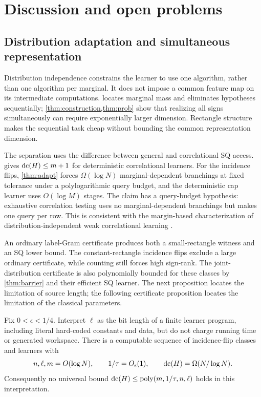 \section{Discussion and open problems}\label{sec:discussion}
\subsection{Distribution adaptation and simultaneous representation}
Distribution independence constrains the learner to use one algorithm, rather than one algorithm per marginal. It does not impose a common feature map on its intermediate computations.  locates marginal mass and eliminates hypotheses sequentially; \cref{thm:construction,thm:prob} show that realizing all signs simultaneously can require exponentially larger dimension. Rectangle structure makes the sequential task cheap without bounding the common representation dimension.

The separation uses the difference between general and correlational SQ access.  gives $\operatorname{dc}(H)\le m+1$ for deterministic correlational learners. For the incidence flips, \cref{thm:adapt} forces $\Omega(\log N)$ marginal-dependent branchings at fixed tolerance under a polylogarithmic query budget, and the deterministic cap learner uses $O(\log M)$ stages. The claim has a query-budget hypothesis: exhaustive correlation testing uses no marginal-dependent branchings but makes one query per row. This is consistent with the margin-based characterization of distribution-independent weak correlational learning \citep{Feldman08,Feldman11}.

An ordinary label-Gram certificate produces both a small-rectangle witness and an SQ lower bound. The constant-rectangle incidence flips exclude a large ordinary certificate, while counting still forces high sign-rank. The joint-distribution certificate is also polynomially bounded for these classes by \cref{thm:barrier} and their efficient SQ learner. The next proposition locates the limitation of source length; the following certificate proposition locates the limitation of the classical parameters.

\begin{theorem}\label{thm:description}
Fix $0<\epsilon<1/4$. Interpret $\ell$ as the bit length of a finite learner program, including literal hard-coded constants and data, but do not charge running time or generated workspace. There is a computable sequence of incidence-flip classes and learners with
\[
 n,\ell,m=O(\log N),\qquad 1/\tau=O_\epsilon(1),\qquad
 \operatorname{dc}(H)=\Omega(N/\log N).
\]
Consequently no universal bound $\operatorname{dc}(H)\le\operatorname{poly}(m,1/\tau,n,\ell)$ holds in this interpretation.
\end{theorem}

